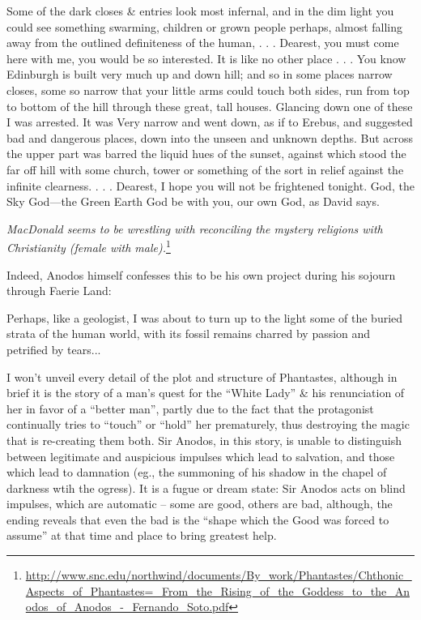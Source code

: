 \begin{quotex}
Some of the dark closes \& entries look most infernal, and in the dim light you could see something swarming, children or grown people perhaps, almost falling away from the outlined definiteness of the human, . . . Dearest, you must come here with me, you would be so interested. It is like no other place . . . You know Edinburgh is built very much up and down hill; and so in some places narrow closes, some so narrow that your little arms could touch both sides, run from top to bottom of the hill through these great, tall houses. Glancing down one of these I was arrested. It was Very narrow and went down, as if to Erebus, and suggested bad and dangerous places, down into the unseen and unknown depths. But across the upper part was barred the liquid hues of the sunset, against which stood the far off hill with some church, tower or something of the sort in relief against the infinite clearness. . . . Dearest, I hope you will not be frightened tonight. God, the Sky God---the Green Earth God be with you, our own God, as David says.
\end{quotex}



\emph{MacDonald seems to be wrestling with reconciling the mystery religions with Christianity (female with male).}\footnote{\url{http://www.snc.edu/northwind/documents/By_work/Phantastes/Chthonic\_Aspects\_of\_Phantastes=\_From\_the\_Rising\_of\_the\_Goddess\_to\_the\_Anodos\_of\_Anodos\_-\_Fernando\_Soto.pdf}}

Indeed, Anodos himself confesses this to be his own project during his sojourn through Faerie Land:

\begin{quotex}
Perhaps, like a geologist, I was about to turn up to the light some of the buried strata of the human world, with its fossil remains charred by passion and petrified by tears... 
\end{quotex}


I won't unveil every detail of the plot and structure of Phantastes, although in brief it is the story of a man's quest for the ``White Lady'' \& his renunciation of her in favor of a ``better man'', partly due to the fact that the protagonist continually tries to ``touch'' or ``hold'' her prematurely, thus destroying the magic that is re-creating them both. Sir Anodos, in this story, is unable to distinguish between legitimate and auspicious impulses which lead to salvation, and those which lead to damnation (eg., the summoning of his shadow in the chapel of darkness wtih the ogress). It is a fugue or dream state: Sir Anodos acts on blind impulses, which are automatic -- some are good, others are bad, although, the ending reveals that even the bad is the ``shape which the Good was forced to assume'' at that time and place to bring greatest help.

